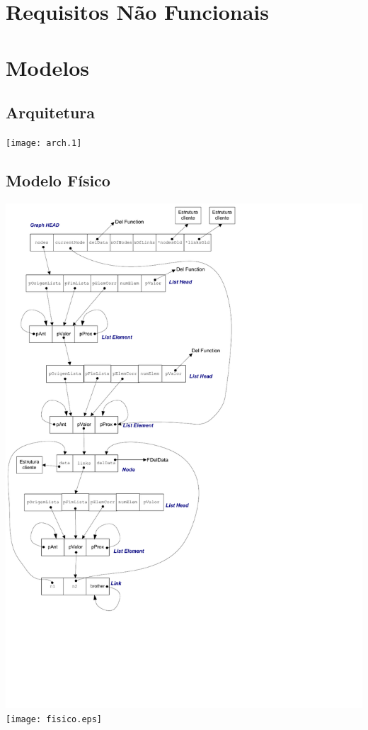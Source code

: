 \documentclass[a4paper,12pt]{article}
\begin{document}
\section{Requisitos Não Funcionais}

\section{Modelos}
\subsection{Arquitetura}
\texttt{[image: arch.1]}

\subsection{Modelo Físico}
\ifpdf
\includegraphics{fisico.pdf}
\else
\texttt{[image: fisico.eps]}
\fi
\end{document}
